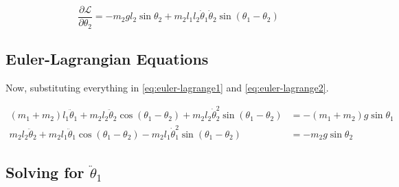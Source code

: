 \documentclass{article}
\begin{document}
\[
\frac{\partial \mathcal{L}}{\partial \theta_2} = -m_2 g l_2 \sin \theta_2 + m_2 l_1 l_2 \dot{\theta}_1 \dot{\theta}_2 \sin(\theta_1 - \theta_2)
\]

\subsection*{Euler-Lagrangian Equations}
Now, substituting everything in \eqref{eq:euler-lagrange1} and \eqref{eq:euler-lagrange2}.

\begin{align}
(m_1 + m_2) l_1 \ddot{\theta}_1 + m_2 l_2 \ddot{\theta}_2 \cos(\theta_1 - \theta_2) + m_2 l_2 \dot{\theta}_2^2 \sin(\theta_1 - \theta_2) &= - (m_1 + m_2) g \sin \theta_1 \label{eq:equation3} \\
m_2 l_2 \ddot{\theta}_2 + m_2 l_1 \ddot{\theta}_1 \cos(\theta_1 - \theta_2) - m_2 l_1 \dot{\theta}_1^2 \sin(\theta_1 - \theta_2) &= - m_2 g \sin \theta_2 \label{eq:equation4}
\end{align}

\subsection*{Solving for \(\ddot{\theta}_1\)}
\end{document}
